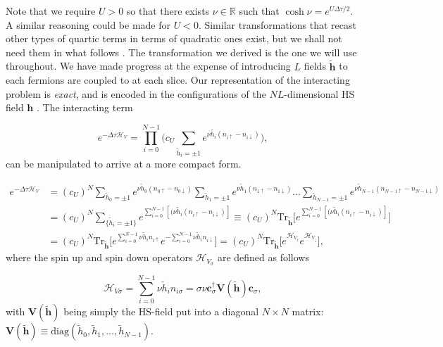 Note that we require $U > 0$ so that there exists $\nu \in \mathbb{R}$ such that $\cosh \nu = e^{U\Delta \tau / 2}$. A similar reasoning could be made for $U < 0$.
Similar transformations that recast other types of quartic terms in terms of quadratic ones exist, but we shall not need them in what follows \cite{hirsch_monte_1983}.
The transformation we derived is the one we will use throughout.
We have made progress at the expense of introducing $L$ fields $\widetilde{\bm h}$ to each fermions are coupled to at each slice. 
Our representation of the interacting problem is \emph{exact}, and is encoded in the configurations of the $NL$-dimensional HS field $\bm h$  \cite{hou_numerical_2009}.
The interacting term

\begin{equation} 
 e^{-\Delta\tau \mathcal{H}_V} = \prod_{i=0}^{N-1} \bigg( c_U \sum_{\widetilde{h}_i = \pm 1} e^{\nu \widetilde{h_i} ( n_{i\uparrow} - n_{i\downarrow} )} \bigg),
\end{equation} 
can be manipulated to arrive at a more compact form.

\begin{equation}\label{eq:exp_quartic}
\begin{split}
e^{-\Delta\tau \mathcal{H}_V} &=  (c_U)^N \sum_{\widetilde{h}_0 = \pm 1} e^{\nu \widetilde{h}_0 ( n_{0\uparrow} - n_{0\downarrow} )} \sum_{\widetilde{h}_1 = \pm 1} e^{\nu \widetilde{h}_1 ( n_{1\uparrow} - n_{1\downarrow} )} ... \sum_{\widetilde{h}_{N-1} = \pm 1} e^{\nu \widetilde{h}_{N-1} ( n_{N-1\uparrow} - n_{N-1\downarrow} )} \\
&= (c_U)^N \sum_{ \{ \widetilde{h}_i = \pm 1 \}} e^{\sum_{i=0}^{N-1} [(\nu \widetilde{h}_i ( n_{i\uparrow} - n_{i\downarrow} ) ]} \equiv (c_U)^N \text{Tr}_{\widetilde{\bm h}} \bigg[ e^{\sum_{i=0}^{N-1} [(\nu \widetilde{h}_i ( n_{i\uparrow} - n_{i\downarrow} ) ]} \bigg] \\
&= (c_U)^N \text{Tr}_{\widetilde{\bm h}} \bigg[ e^{\sum_{i=0}^{N-1} \nu \widetilde{h}_i n_{i\uparrow}} e^{-\sum_{i=0}^{N-1} \nu \widetilde{h}_i n_{i\downarrow}} \bigg] = (c_U)^N \text{Tr}_{\widetilde{\bm h}} \bigg[ e^{\mathcal{H}_{V_\uparrow}} e^{\mathcal{H}_{V_\downarrow}} \bigg] ,
\end{split}
\end{equation}
where the spin up and spin down operators $\mathcal{H}_{V_\sigma}$ are defined as follows

\begin{equation}
\mathcal{H}_{V\sigma} = \sum_{i=0}^{N-1} \nu \widetilde{h}_i n_{i\sigma} = \sigma \nu \bm c_\sigma^\dagger \bm V(\widetilde{\bm h}) \bm c_\sigma,
\end{equation}
with $\bm V(\widetilde{\bm h})$ being simply the HS-field put into a diagonal $N\times N$ matrix: $\bm V(\widetilde{\bm h}) \equiv \text{diag}(\widetilde{h}_0, \widetilde{h}_1, ..., \widetilde{h}_{N-1})$.

